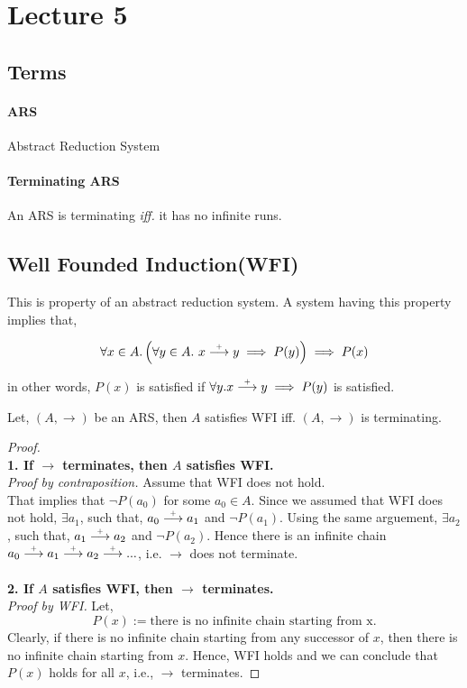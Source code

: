\section{Lecture 5}

\subsection{Terms}

\paragraph{ARS} Abstract Reduction System

\paragraph{Terminating ARS} An ARS is terminating \emph{iff.} it has no infinite runs.

\subsection{Well Founded Induction(WFI)}

This is property of an abstract reduction system. A system having this property implies that,

$$
\forall x \in A. \left( \forall y \in A. \ x \stackrel{\scriptscriptstyle\!+\!}\longrightarrow y \implies P(y) \right) \implies P(x)
$$

in other words,
$P(x)$ is satisfied if $\forall y. x \stackrel{\scriptscriptstyle\!+\!}\longrightarrow y \implies P(y)$ is satisfied.

\begin{theorem}
    Let, $(A, \longrightarrow)$ be an ARS, then $A$ satisfies WFI iff. $(A, \longrightarrow)$ is terminating.
\end{theorem}

\begin{proof}
    \text{} \\
    \textbf{1. If $\longrightarrow$ terminates, then $A$ satisfies WFI.} \\
    \emph{Proof by contraposition.} Assume that WFI does not hold. \\
    That implies that $\neg P(a_0)$ for some $a_0 \in A$. Since we assumed that WFI does not hold, $\exists a_1$, such that, $a_0 \stackrel{\scriptscriptstyle\!+\!}\longrightarrow a_1$ and $\neg P(a_1)$. Using the same arguement, $\exists a_2$, such that, $a_1 \stackrel{\scriptscriptstyle\!+\!}\longrightarrow a_2$ and $\neg P(a_2)$. Hence there is an infinite chain $a_0 \stackrel{\scriptscriptstyle\!+\!}\longrightarrow a_1 \stackrel{\scriptscriptstyle\!+\!}\longrightarrow a_2 \stackrel{\scriptscriptstyle\!+\!}\longrightarrow ...$, i.e. $\longrightarrow$ does not terminate. \\
    \\
    \textbf{2. If $A$ satisfies WFI, then $\longrightarrow$ terminates.} \\
    \emph{Proof by WFI.} Let,
    $$
    P(x) := \text{there is no infinite chain starting from x}.
    $$
    Clearly, if there is no infinite chain starting from any successor of $x$, then there is no infinite chain starting from $x$. Hence, WFI holds and we can conclude that $P(x)$ holds for all $x$, i.e., $\longrightarrow$ terminates.
\end{proof}

